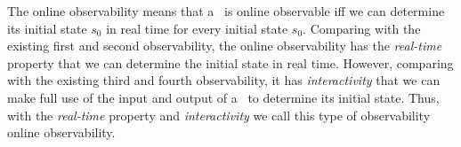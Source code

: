 The online observability means that a \BCN\ is online observable iff we can determine its initial state $s_0$ in real time for every initial state $s_0$. Comparing with the existing first and second observability, the online observability has the {\em real-time} property that we can determine the initial state in real time. However, comparing with the existing third and fourth observability, it has {\em interactivity} that we can make full use of the input and output of a \BCN\ to determine its initial state. Thus, with the {\em real-time} property and {\em interactivity} we call this type of observability online observability. %




